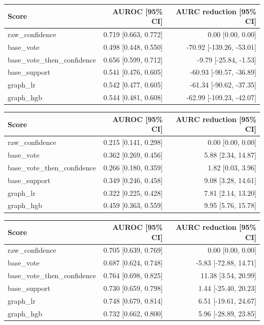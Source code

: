 \begin{tabular}{lrr}
\hline
Score & AUROC [95\% CI] & AURC reduction [95\% CI] \\
\hline
raw\_confidence & 0.719 [0.663, 0.772] & 0.00 [0.00, 0.00] \\
base\_vote & 0.498 [0.448, 0.550] & -70.92 [-139.26, -53.01] \\
base\_vote\_then\_confidence & 0.656 [0.599, 0.712] & -9.79 [-25.84, -1.53] \\
base\_support & 0.541 [0.476, 0.605] & -60.93 [-90.57, -36.89] \\
graph\_lr & 0.542 [0.477, 0.605] & -61.34 [-90.62, -37.35] \\
graph\_hgb & 0.544 [0.481, 0.608] & -62.99 [-109.23, -42.07] \\
\hline
\end{tabular}

\begin{tabular}{lrr}
\hline
Score & AUROC [95\% CI] & AURC reduction [95\% CI] \\
\hline
raw\_confidence & 0.215 [0.141, 0.298] & 0.00 [0.00, 0.00] \\
base\_vote & 0.362 [0.269, 0.456] & 5.88 [2.34, 14.87] \\
base\_vote\_then\_confidence & 0.266 [0.180, 0.359] & 1.82 [0.03, 3.96] \\
base\_support & 0.349 [0.246, 0.458] & 9.08 [3.28, 14.61] \\
graph\_lr & 0.322 [0.225, 0.428] & 7.81 [2.14, 13.20] \\
graph\_hgb & 0.459 [0.363, 0.559] & 9.95 [5.76, 15.78] \\
\hline
\end{tabular}

\begin{tabular}{lrr}
\hline
Score & AUROC [95\% CI] & AURC reduction [95\% CI] \\
\hline
raw\_confidence & 0.705 [0.639, 0.769] & 0.00 [0.00, 0.00] \\
base\_vote & 0.687 [0.624, 0.748] & -5.83 [-72.88, 14.71] \\
base\_vote\_then\_confidence & 0.764 [0.698, 0.825] & 11.38 [3.54, 20.99] \\
base\_support & 0.730 [0.659, 0.798] & 1.44 [-25.40, 20.23] \\
graph\_lr & 0.748 [0.679, 0.814] & 6.51 [-19.61, 24.67] \\
graph\_hgb & 0.732 [0.662, 0.800] & 5.96 [-28.89, 23.85] \\
\hline
\end{tabular}


